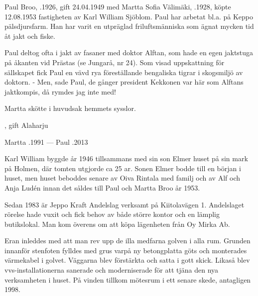 
%
Paul Broo, .1926, gift 24.04.1949 med Martta Sofia Välimäki, .1928, köpte 12.08.1953 fastigheten av Karl William Sjöblom. Paul har arbetat bl.a. på Keppo pälsdjursfarm. Han har varit en utpräglad friluftsmänniska som ägnat mycken tid åt jakt och fiske.

Paul deltog ofta i jakt av fasaner med doktor Alftan, som hade en egen jaktstuga på åkanten vid Prästas (se Jungarå, nr 24). Som visad uppskattning för sällskapet fick Paul en vävd rya föreställande bengaliska tigrar i skogsmiljö av doktorn. - Men, sade Paul, de gånger president Kekkonen var här som Alftans jaktkompis, då rymdes jag inte med!

Martta skötte i huvudsak hemmets sysslor.
\begin{jhchildren}
  \item {}, gift Alaharju
  \item {}
\end{jhchildren}

Martta .1991  ---  Paul .2013


%
Karl William byggde år 1946 tillsammans med sin son Elmer huset på sin mark på Holmen, där tomten utgjorde ca 25 ar. Sonen Elmer bodde till en början i huset, men huset beboddes senare av Oiva Rintala med familj och av Alf och Anja Ludén innan det såldes till Paul och Martta Broo år 1953.



%



%
Sedan 1983 är Jeppo Kraft Andelslag verksamt på Kiitolavägen 1. Andelslaget rörelse hade vuxit och fick behov av både större kontor och en lämplig butikslokal. Man kom överens om att köpa lägenheten från Oy Mirka Ab.

Eran inleddes med att man rev upp de illa medfarna golven i alla rum. Grunden innanför stenfoten fylldes med grus varpå ny betongplatta göts och monterades värmekabel i golvet. Väggarna blev förstärkta och satta i gott skick. Likaså blev vvs-installationerna sanerade och moderniserade för att tjäna den nya verksamheten i huset. På vinden tillkom mötesrum i ett senare skede, antagligen 1998.

